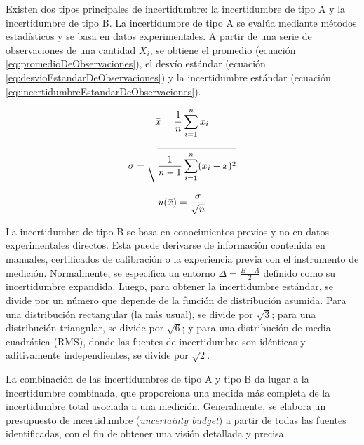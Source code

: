 Existen dos tipos principales de incertidumbre: la incertidumbre de tipo A y la incertidumbre de tipo B. La incertidumbre de tipo A se evalúa mediante métodos estadísticos y se basa en datos experimentales. A partir de una serie de observaciones de una cantidad $X_{i}$, se obtiene el promedio (ecuación \ref{eq:promedioDeObservaciones}), el desvío estándar (ecuación \ref{eq:desvioEstandarDeObservaciones}) y la incertidumbre estándar (ecuación \ref{eq:incertidumbreEstandarDeObservaciones}).


\begin{equation}
    \centering
    \bar{x} = \frac{1}{n}\sum_{i=1}^{n} x_{i}
    \label{eq:promedioDeObservaciones}
\end{equation}

\begin{equation}
    \centering
    \sigma = \sqrt{\frac{1}{n-1} \sum_{i=1}^{n} (x_i - \bar{x})^2}
    \label{eq:desvioEstandarDeObservaciones}
\end{equation}

\begin{equation}
    \centering
    u(\bar{x}) = \frac{\sigma}{\sqrt{n}}
    \label{eq:incertidumbreEstandarDeObservaciones}
\end{equation}

La incertidumbre de tipo B se basa en conocimientos previos y no en datos experimentales directos. Esta puede derivarse de información contenida en manuales, certificados de calibración o la experiencia previa con el instrumento de medición. Normalmente, se especifica un entorno $\Delta = \frac{B-A}{2}$ definido como su incertidumbre expandida. Luego, para obtener la incertidumbre estándar, se divide por un número que depende de la función de distribución asumida. Para una distribución rectangular (la más usual), se divide por $\sqrt{3}$; para una distribución triangular, se divide por $\sqrt{6}$; y para una distribución de media cuadrática (RMS), donde las fuentes de incertidumbre son idénticas y aditivamente independientes, se divide por $\sqrt{2}$.

La combinación de las incertidumbres de tipo A y tipo B da lugar a la incertidumbre combinada, que proporciona una medida más completa de la incertidumbre total asociada a una medición. Generalmente, se elabora un presupuesto de incertidumbre (\textit{uncertainty budget}) a partir de todas las fuentes identificadas, con el fin de obtener una visión detallada y precisa.

